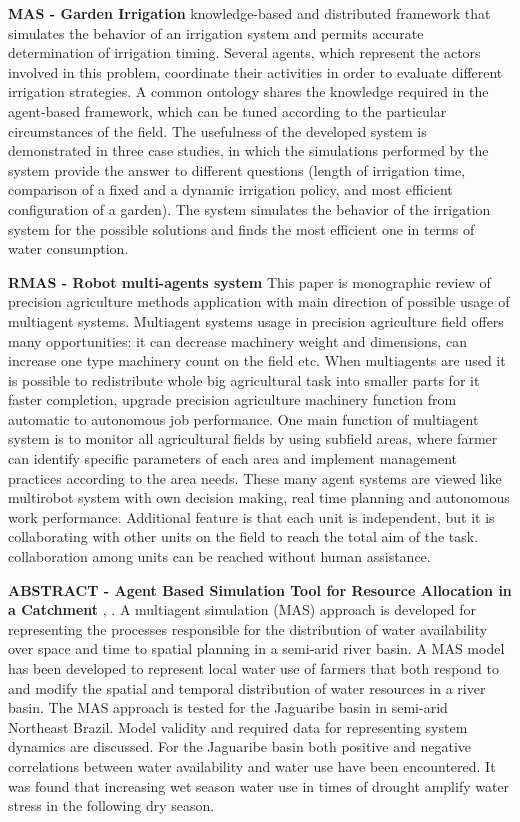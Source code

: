 \documentclass[letterpaper, 10 pt, conference]{ieeeconf}  %
\begin{document}
\textbf{MAS - Garden Irrigation} \cite{Isern2012} knowledge-based and distributed framework that simulates the behavior of an irrigation system and permits accurate determination of irrigation timing. Several agents, which represent the actors involved in this problem, coordinate their activities in order to evaluate different irrigation strategies. A common ontology shares the knowledge required in the agent-based framework, which can be tuned according to the particular circumstances of the field. The usefulness of the developed system is demonstrated in three case studies, in which the simulations performed by the system provide the answer to different questions (length of irrigation time, comparison of a fixed and a dynamic irrigation policy, and most efficient configuration of a garden). The system simulates the behavior of the irrigation system for the possible solutions and finds the most efficient one in terms of water consumption.

\textbf{RMAS - Robot multi-agents system} \cite{pentjuss2011improving} This paper is monographic review of precision agriculture methods application with main direction of possible usage of multiagent systems.  Multiagent  systems  usage  in  precision  agriculture  field  offers  many opportunities: it can decrease machinery weight and dimensions, can increase one type machinery count on the field etc. When multiagents are used it is possible to redistribute whole big agricultural task into smaller parts for it  faster  completion,  upgrade  precision  agriculture  machinery  function  from  automatic  to  autonomous  job performance. One main function of multiagent system is to monitor all agricultural fields by using subfield areas, where farmer can identify specific parameters of each area and implement management practices according to the  area  needs.  These  many agent systems are viewed like multirobot system with own decision making, real time planning and autonomous work performance. Additional feature is that each unit is independent, but it is collaborating with other units on the field to reach the total aim of the task. collaboration among units can be reached without human assistance. 


\textbf{ABSTRACT - Agent Based Simulation Tool for Resource Allocation in a Catchment} \cite{Oel2010}, \cite{Oel2012}. A multiagent simulation (MAS) approach is developed for representing the processes responsible for the distribution of water availability over space and time to spatial planning in a semi-arid river basin. A MAS model has been developed to represent local water use of farmers that both respond to and modify the spatial and temporal distribution of water resources in a river basin. The MAS approach is tested for the Jaguaribe basin in semi-arid Northeast Brazil. Model validity and required data for representing system dynamics are discussed. For the Jaguaribe basin both positive and negative correlations between water availability and water use have been encountered. It was found that increasing wet season water use in times of drought amplify water stress in the following dry season. 
\end{document}
